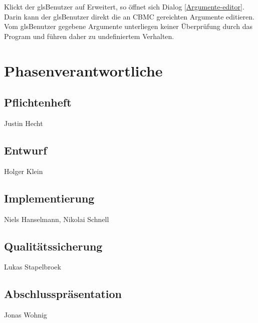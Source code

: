 \documentclass[a4paper]{scrreprt}
\begin{document}
Klickt der gls{Benutzer} auf Erweitert, so öffnet sich Dialog \ref{Argumente-editor}. Darin kann der gls{Benutzer} direkt die an \ac{CBMC} gereichten Argumente editieren. Vom gls{Benutzer} gegebene Argumente unterliegen keiner Überprüfung durch das Program und führen daher zu undefiniertem Verhalten. 

\chapter{Phasenverantwortliche}
\section{Pflichtenheft} Justin Hecht
\section{Entwurf} Holger Klein 
\section{Implementierung} Niels Hanselmann, Nikolai Schnell
\section{Qualitätssicherung} Lukas Stapelbroek
\section{Abschlusspräsentation} Jonas Wohnig


\printglossaries
 

 
\end{document}
